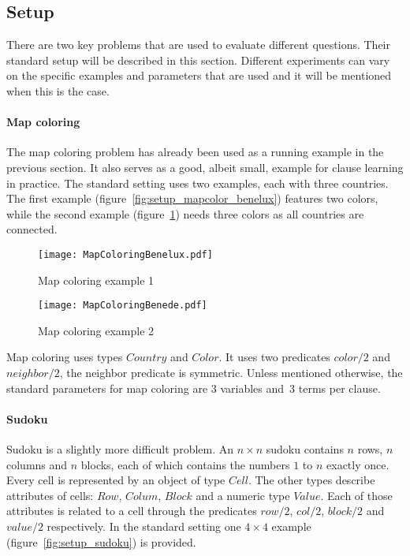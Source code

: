 \subsection{Setup}
There are two key problems that are used to evaluate different questions.
Their standard setup will be described in this section.
Different experiments can vary on the specific examples and parameters that are used and it will be mentioned when this is the case.

\paragraph{Map coloring}
The map coloring problem has already been used as a running example in the previous section.
It also serves as a good, albeit small, example for clause learning in practice.
The standard setting uses two examples, each with three countries.
The first example (figure~\ref{fig:setup_mapcolor_benelux}) features two colors, while the second example (figure~\ref{fig:setup_mapcolor_benede}) needs three colors as all countries are connected.

\begin{figure}
\centering
\begin{minipage}{.5\textwidth}
  \centering
  \texttt{[image: MapColoringBenelux.pdf]}
  \caption{Map coloring example 1}
  \label{fig:setup_mapcolor_benelux}
\end{minipage}%
\begin{minipage}{.5\textwidth}
  \centering
  \texttt{[image: MapColoringBenede.pdf]}
  \caption{Map coloring example 2}
  \label{fig:setup_mapcolor_benede}
\end{minipage}
\end{figure}

Map coloring uses types $\mathit{Country}$ and $\mathit{Color}$.
It uses two predicates $\mathit{color/2}$ and $\mathit{neighbor/2}$, the neighbor predicate is symmetric.
Unless mentioned otherwise, the standard parameters for map coloring are $3$ variables and~$3$ terms per clause.

\paragraph{Sudoku}
Sudoku is a slightly more difficult problem.
An $n \times n$ sudoku contains $n$ rows, $n$ columns and $n$ blocks, each of which contains the numbers $1$ to $n$ exactly once.
Every cell is represented by an object of type $\mathit{Cell}$.
The other types describe attributes of cells: $\mathit{Row}$, $\mathit{Colum}$, $\mathit{Block}$ and a numeric type $\mathit{Value}$.
Each of those attributes is related to a cell through the predicates $\mathit{row/2}$, $\mathit{col/2}$, $\mathit{block/2}$ and $\mathit{value/2}$ respectively.
In the standard setting one $4 \times 4$ example (figure~\ref{fig:setup_sudoku}) is provided.

